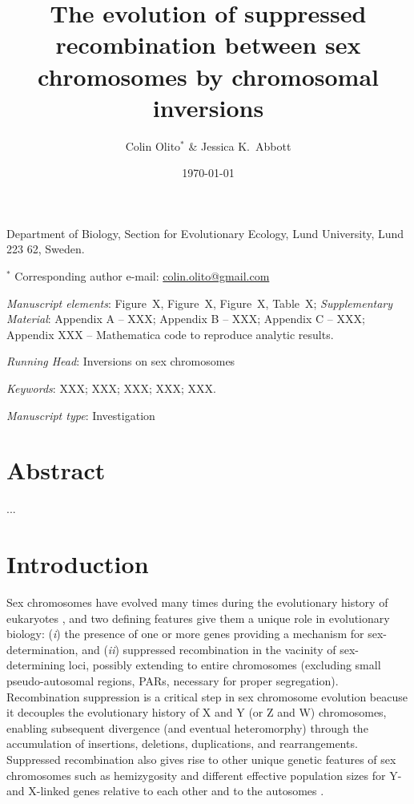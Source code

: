 \documentclass{article}
\title{The evolution of suppressed recombination between sex chromosomes by chromosomal inversions}
\author{Colin Olito$^{\ast}$ \& Jessica K.~Abbott}
\date{\today}
\begin{document}
\maketitle

\noindent{} Department of Biology, Section for Evolutionary Ecology, Lund University, Lund 223 62, Sweden.

\noindent{} $^{\ast}$ Corresponding author e-mail: \url{colin.olito@gmail.com}

\bigskip

\noindent{} \textit{Manuscript elements}: Figure~X, Figure~X, Figure~X, Table~X; {\itshape Supplementary Material}: Appendix A -- XXX; Appendix B -- XXX; Appendix C -- XXX; Appendix XXX -- Mathematica code to reproduce analytic results.

\bigskip
\noindent{} \textit{Running Head}: Inversions on sex chromosomes

\bigskip

\noindent{} \textit{Keywords}: XXX; XXX; XXX; XXX; XXX.

\bigskip

\noindent{} \textit{Manuscript type}: Investigation

\bigskip


\linenumbers
\modulolinenumbers[1]
\renewcommand\linenumberfont{\normalfont\small}


\newpage{}
\section*{Abstract}

\noindent{} ...
\newpage{}


\section*{Introduction} \label{sec:Introduction}

Sex chromosomes have evolved many times during the evolutionary history of eukaryotes \citep{Bull1983, Bachtrog2014}, and two defining features give them a unique role in evolutionary biology: ({\itshape i}) the presence of one or more genes providing a mechanism for sex-determination, and ({\itshape ii}) suppressed recombination in the vacinity of sex-determining loci, possibly extending to entire chromosomes (excluding small pseudo-autosomal regions, PARs, necessary for proper segregation). Recombination suppression is a critical step in sex chromosome evolution beacuse it decouples the evolutionary history of X and Y (or Z and W) chromosomes, enabling subsequent divergence (and eventual heteromorphy) through the accumulation of insertions, deletions, duplications, and rearrangements. Suppressed recombination also gives rise to other unique genetic features of sex chromosomes such as hemizygosity and different effective population sizes for Y- and X-linked genes relative to each other and to the autosomes \citep{BergeroCharlesworth2009,CharlesworthMarais2005}.
	
\end{document}
